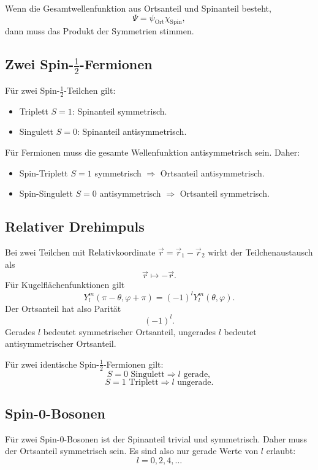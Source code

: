 Wenn die Gesamtwellenfunktion aus Ortsanteil und Spinanteil besteht,
\[
    \Psi=\psi_{\mathrm{Ort}}\chi_{\mathrm{Spin}},
\]
dann muss das Produkt der Symmetrien stimmen.

\subsection{Zwei Spin-\texorpdfstring{\(\frac12\)}{1/2}-Fermionen}

Für zwei Spin-\(\frac12\)-Teilchen gilt:
\begin{itemize}
    \item Triplett \(S=1\): Spinanteil symmetrisch.
    \item Singulett \(S=0\): Spinanteil antisymmetrisch.
\end{itemize}
Für Fermionen muss die gesamte Wellenfunktion antisymmetrisch sein. Daher:
\begin{itemize}
    \item Spin-Triplett \(S=1\) symmetrisch \(\Rightarrow\) Ortsanteil antisymmetrisch.
    \item Spin-Singulett \(S=0\) antisymmetrisch \(\Rightarrow\) Ortsanteil symmetrisch.
\end{itemize}

\subsection{Relativer Drehimpuls}

Bei zwei Teilchen mit Relativkoordinate \(\vec r=\vec r_1-\vec r_2\) wirkt der Teilchenaustausch als
\[
    \vec r\mapsto -\vec r.
\]
Für Kugelflächenfunktionen gilt
\[
    Y_l^m(\pi-\theta,\varphi+\pi)=(-1)^lY_l^m(\theta,\varphi).
\]
Der Ortsanteil hat also Parität
\[
    (-1)^l.
\]
Gerades \(l\) bedeutet symmetrischer Ortsanteil, ungerades \(l\) bedeutet antisymmetrischer Ortsanteil.

\begin{formulabox}
Für zwei identische Spin-\(\frac12\)-Fermionen gilt:
\[
    S=0 \text{ Singulett} \Rightarrow l \text{ gerade},
\]
\[
    S=1 \text{ Triplett} \Rightarrow l \text{ ungerade}.
\]
\end{formulabox}

\subsection{Spin-0-Bosonen}

Für zwei Spin-0-Bosonen ist der Spinanteil trivial und symmetrisch. Daher muss der Ortsanteil symmetrisch sein. Es sind also nur gerade Werte von \(l\) erlaubt:
\[
    l=0,2,4,\dots
\]


